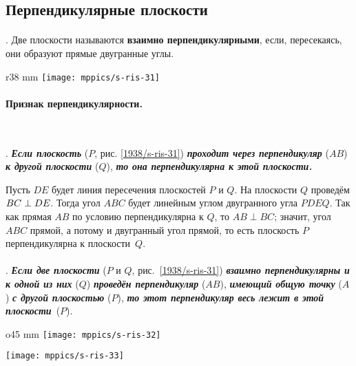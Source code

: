 \subsection*{Перпендикулярные плоскости}

\paragraph{}\label{1938/s42}
\mbox{.}
Две плоскости называются \textbf{взаимно перпендикулярными}, если, пересекаясь, они образуют прямые двугранные углы.

\begin{wrapfigure}{r}{38 mm}
\vskip0mm
\centering
\texttt{[image: mppics/s-ris-31]}
\caption{}\label{1938/s-ris-31}
\end{wrapfigure}

\paragraph{Признак перпендикулярности.}\label{1938/s43}\ 

\mbox{.}
\textbf{\emph{Если плоскость}} ($P$, рис. \ref{1938/s-ris-31}) \textbf{\emph{проходит через перпендикуляр}} ($AB$) \textbf{\emph{к другой плоскости}} ($Q$), \textbf{\emph{то она перпендикулярна к этой плоскости.}}

Пусть $DE$ будет линия пересечения плоскостей $P$ и $Q$.
На плоскости $Q$ проведём $BC \z\perp DE$.
Тогда угол $ABC$ будет линейным углом двугранного угла $PDEQ$.
Так как прямая $AB$ по условию перпендикулярна к $Q$, то $AB\perp BC$;
значит, угол $ABC$ прямой, а потому и двугранный угол прямой, то есть плоскость $P$ перпендикулярна к плоскости~$Q$.

\paragraph{}\label{1938/s44}
.
\textbf{\emph{Если две плоскости}} ($P$ и $Q$, рис.~\ref{1938/s-ris-31}) \textbf{\emph{взаимно перпендикулярны и к одной из них}} ($Q$) \textbf{\emph{проведён перпендикуляр}} ($AB$), \textbf{\emph{имеющий общую точку}} ($A$) \textbf{\emph{с другой плоскостью}} ($P$), \textbf{\emph{то этот перпендикуляр весь лежит в этой плоскости}}~($P$).

\begin{wrapfigure}{o}{45 mm}
\centering
\texttt{[image: mppics/s-ris-32]}
\caption{}\label{1938/s-ris-32}
\bigskip
\texttt{[image: mppics/s-ris-33]}
\caption{}\label{1938/s-ris-33}
\end{wrapfigure}

